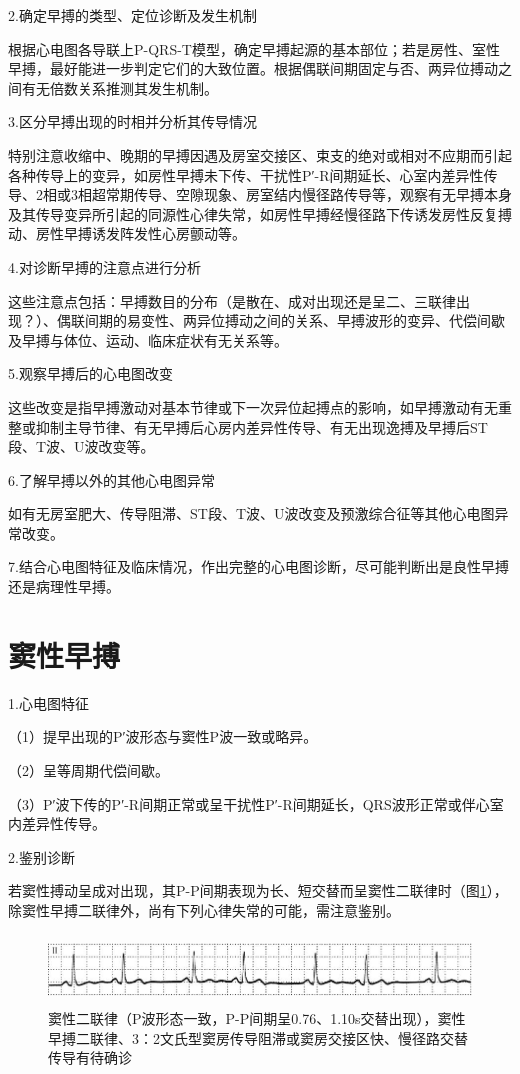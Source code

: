 2.确定早搏的类型、定位诊断及发生机制

根据心电图各导联上P-QRS-T模型，确定早搏起源的基本部位；若是房性、室性早搏，最好能进一步判定它们的大致位置。根据偶联间期固定与否、两异位搏动之间有无倍数关系推测其发生机制。

3.区分早搏出现的时相并分析其传导情况

特别注意收缩中、晚期的早搏因遇及房室交接区、束支的绝对或相对不应期而引起各种传导上的变异，如房性早搏未下传、干扰性P′-R间期延长、心室内差异性传导、2相或3相超常期传导、空隙现象、房室结内慢径路传导等，观察有无早搏本身及其传导变异所引起的同源性心律失常，如房性早搏经慢径路下传诱发房性反复搏动、房性早搏诱发阵发性心房颤动等。

4.对诊断早搏的注意点进行分析

这些注意点包括：早搏数目的分布（是散在、成对出现还是呈二、三联律出现？）、偶联间期的易变性、两异位搏动之间的关系、早搏波形的变异、代偿间歇及早搏与体位、运动、临床症状有无关系等。

5.观察早搏后的心电图改变

这些改变是指早搏激动对基本节律或下一次异位起搏点的影响，如早搏激动有无重整或抑制主导节律、有无早搏后心房内差异性传导、有无出现逸搏及早搏后ST段、T波、U波改变等。

6.了解早搏以外的其他心电图异常

如有无房室肥大、传导阻滞、ST段、T波、U波改变及预激综合征等其他心电图异常改变。

7.结合心电图特征及临床情况，作出完整的心电图诊断，尽可能判断出是良性早搏还是病理性早搏。

\protect\hypertarget{text00018.htmlux5cux23subid132}{}{}

\section{窦性早搏}

1.心电图特征

（1）提早出现的P′波形态与窦性P波一致或略异。

（2）呈等周期代偿间歇。

（3）P′波下传的P′-R间期正常或呈干扰性P′-R间期延长，QRS波形正常或伴心室内差异性传导。

2.鉴别诊断

若窦性搏动呈成对出现，其P-P间期表现为长、短交替而呈窦性二联律时（图\ref{fig11-2}），除窦性早搏二联律外，尚有下列心律失常的可能，需注意鉴别。

\begin{figure}[!htbp]
 \centering
 \includegraphics[width=5.82292in,height=0.72917in]{./images/Image00154.jpg}
 \captionsetup{justification=centering}
 \caption{窦性二联律（P波形态一致，P-P间期呈0.76、1.10s交替出现），窦性早搏二联律、3：2文氏型窦房传导阻滞或窦房交接区快、慢径路交替传导有待确诊}
 \label{fig11-2}
  \end{figure} 

